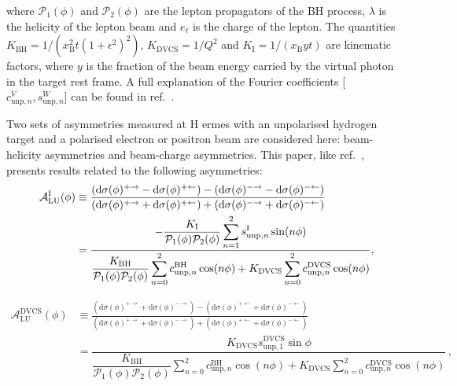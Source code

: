 where $\mathcal{P}_1(\phi)$ and $\mathcal{P}_2(\phi)$ are the lepton propagators
of the BH process, $\lambda$ is the
helicity of the lepton beam and $e_\ell$ is the  charge of
 the  lepton.  The
quantities $K_{\textrm{BH}}=1/(x_\textrm{B}^2t(1+\epsilon^2)^2)$,
$K_{\textrm{DVCS}}=1/Q^2$
and $K_{\textrm{I}}=1/(x_{\textrm{B}}yt)$ are kinematic factors, where
$y$ is the fraction of the beam energy carried by the virtual photon in
the target rest frame. A full explanation of the Fourier coefficients [$c_{\textrm{unp},n}^V,s_{\textrm{unp},n}^W$] can be found in ref.~\cite{Bel02b}.
 
Two sets of asymmetries measured at H{\sc
ermes} with an unpolarised hydrogen target and a polarised electron or positron
beam are considered here:
beam-helicity asymmetries and beam-charge asymmetries. This paper,
like ref.~\cite{Air09}, presents results related to the following asymmetries:
\begin{align}
\hspace{0.5cm}\mathcal{A}^{\textrm{I}}_{\textrm{LU}}(\phi) &\equiv
\frac{(\textrm{d}\sigma(\phi)^{+\rightarrow} -
\textrm{d}\sigma(\phi)^{+\leftarrow}) -
(\textrm{d}\sigma(\phi)^{-\rightarrow}
- \textrm{d}\sigma(\phi)^{-\leftarrow})}{(\textrm{d}\sigma(\phi)^{+\rightarrow}
+
\textrm{d}\sigma(\phi)^{+\leftarrow}) +
(\textrm{d}\sigma(\phi)^{-\rightarrow}
+ \textrm{d}\sigma(\phi)^{-\leftarrow})}&  \nonumber \\
&=\dfrac{-\dfrac{K_{\textrm{I}}}{\mathcal{P}_{1}(\phi)\mathcal{P}_{2}(\phi)}
\displaystyle\sum_{n=1}^2
s_{\textrm{unp},n}^{\textrm{I}}\sin(n\phi)}{\dfrac{K_{\textrm{BH}}}{\mathcal{P}_{1}
(\phi)\mathcal{P}_{
2}(\phi)}
\displaystyle\sum_{n=0}^2
c_{\textrm{unp},n}^{\textrm{BH}}\cos(n\phi) + 
K_{\textrm{DVCS}}\displaystyle\sum_{n=0}^2 c_{\textrm{unp},n}^{\textrm{DVCS}}\cos(n\phi)},& 
\label{e:alui}
\end{align}

\begin{align}
\mathcal{A}^{\textrm{DVCS}}_{\textrm{LU}}(\phi) &\equiv
\frac{(\textrm{d}\sigma(\phi)^{+\rightarrow} +
\textrm{d}\sigma(\phi)^{-\rightarrow}) -
(\textrm{d}\sigma(\phi)^{+\leftarrow} + 
\textrm{d}\sigma(\phi)^{-\leftarrow})}
{(\textrm{d}\sigma(\phi)^{+\rightarrow} +
\textrm{d}\sigma(\phi)^{-\rightarrow}) +
(\textrm{d}\sigma(\phi)^{+\leftarrow}
+ \textrm{d}\sigma(\phi)^{-\leftarrow})}& \nonumber \\[0.4cm]
&=\dfrac{ K_{\textrm{DVCS}} s_{\textrm{unp},1}^{\textrm{DVCS}}\sin\phi}{\dfrac{K_{\textrm{BH}}}{\mathcal{P}_{1}
(\phi)\mathcal{P}_{2}(\phi)}
\displaystyle\sum_{n=0}^2
c_{\textrm{unp},n}^{\textrm{BH}}\cos(n\phi) + 
K_{\textrm{DVCS}}\displaystyle\sum_{n=0}^2
c_{\textrm{unp},n}^{\textrm{DVCS}}\cos(n\phi)}\, , &
\label{e:aludvcs}
\end{align}

